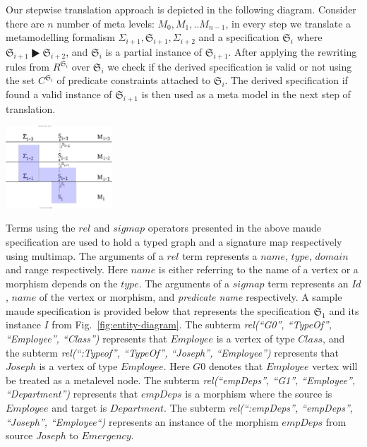 \documentclass{eceasst}
\begin{document}
Our stepwise translation approach is depicted in the following diagram. Consider there are $n$  number of meta levels: $M_0, M_1, .. M_{n-1}$, in every step we translate a metamodelling formalism 
$\Sigma_{i+1}, \mathfrak{S}_{i+1}, \Sigma_{i+2}$ and a specification $\mathfrak{S}_i$ where $\mathfrak{S}_{i+1} \RHD \mathfrak{S}_{i+2}$, and 
$\mathfrak{S}_{i}$ is a partial instance of $\mathfrak{S}_{i+1}$. After applying the rewriting rules from $R^{\mathfrak{S}_i}$ over $\mathfrak{S}_{i}$ we check if the derived specification 
is valid or not using the set $C^{\mathfrak{S}_i}$ of predicate constraints attached to $\mathfrak{S}_{i}$. 
The derived specification if found a valid instance of $\mathfrak{S}_{i+1}$ is then used as a meta model in the next step of translation. 

\begin{center}
\includegraphics[width=0.3\textwidth]{stepwise-dpf.pdf}
\end{center}

Terms using the $rel$ and $sigmap$ operators presented in the above maude specification are used to hold a typed graph and a signature map respectively using multimap. 
The arguments of a $rel$ term represents a $name$, $type$, $domain$ and range respectively. 
Here $name$ is either referring to the name of a vertex or a morphism depends on the $type$. 
The arguments of a $sigmap$ term represents an $Id$, $name$ of the vertex or morphism, and \textit{predicate name} respectively. 
A sample maude specification is provided below that represents the specification $\mathfrak{S}_1$ and its instance $I$ from Fig.~\ref{fig:entity-diagram}. 
The subterm \textit{rel(``G0'', ``TypeOf'', ``Employee'', ``Class'')} represents that $Employee$ is a vertex of type $Class$, and 
the subterm \textit{rel(``:Typeof'', ``TypeOf'', ``Joseph'', ``Employee'')} represents that $Joseph$ is a vertex of type $Employee$.
Here $G0$ denotes that $Employee$ vertex will be treated as a metalevel node. 
The subterm \textit{rel(``empDeps'', ``G1'', ``Employee'', ``Department'')} represents that $empDeps$ is a morphism where the source is $Employee$ and target is $Department$. 
The subterm \textit{rel(``:empDeps'', ``empDeps'', ``Joseph'', ``Employee``)} represents an instance of the morphism $empDeps$ from source $Joseph$ to $Emergency$.
\end{document}
